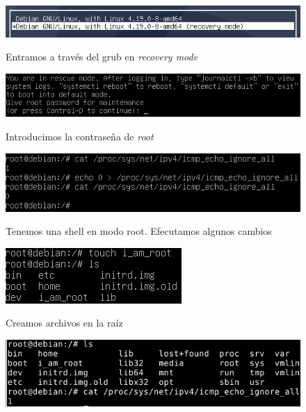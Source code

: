 \documentclass[10pt,a4paper]{article}
\begin{document}
\begin{enumerate}[label=\textbf{\alph*)}]
\begin{figure}[h!]
  \centering
  \includegraphics[scale=0.6]{d1.png}\\
  \caption{Entramos a través del grub en \textit{recovery mode}}
  \label{fig:grub1}
\end{figure}
\begin{figure}[h!]
  \centering
  \includegraphics[scale=0.6]{d2.png}\\
  \caption{Introducimos la contraseña de \textit{root}}
  \label{fig:grub2}
\end{figure}
\begin{figure}[h!]
  \centering
  \includegraphics[scale=0.6]{d3.png}\\
  \caption{Tenemos una shell en modo root. Efecutamos algunos cambios}
  \label{fig:grub3}
\end{figure}
\begin{figure}[h!]
  \centering
  \includegraphics[scale=0.6]{i_am_root.png}\\
  \caption{Creamos archivos en la raíz}
  \label{fig:grub4}
\end{figure}
\begin{figure}[h!]
  \centering
  \includegraphics[scale=0.6]{d4.png}\\

\end{figure}
\end{enumerate}
\end{document}
